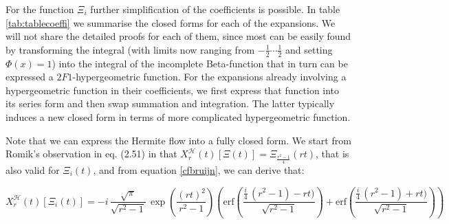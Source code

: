 \documentclass[a4paper,11pt,twoside]{amsart}
\newcommand\erf{\mathrm{erf}}
\begin{document}
\pagebreak
For the function $\Xi_i$ further simplification of the coefficients is possible. In table \ref{tab:tablecoeffi} we summarise the closed forms for each of the expansions. We will not share the detailed proofs for each of them, since most can be easily found by transforming the integral (with limits now ranging from $-\frac12\cdots\frac12$ and setting $\Phi(x)=1$) into the integral of the incomplete Beta-function that in turn can be expressed a $2F1$-hypergeometric function. For the expansions already involving a hypergeometric function in their coefficients, we first express that function into its series form and then swap summation and integration. The latter typically induces a new closed form in terms of more complicated hypergeometric function.

Note that we can express the Hermite flow into a fully closed form. We start from Romik's observation in eq. (2.51) in \cite{rom} that $\displaystyle X^{\mathcal{H}}_r(t)\left[\Xi(t)\right] = \Xi_{\frac{r^2-1}{4}}(rt)$, that is also valid for $\Xi_i(t)$, and from equation \ref{cfbruijn}, we can derive that:

$$X^{\mathcal{H}}_r(t)\left[\Xi_i(t)\right] = -i\,\frac{\sqrt{\pi}}{\sqrt{r^2-1}}\,\exp\left(\frac{(rt)^2}{r^2-1}\right)\left(\erf\left(\frac{\frac{i}{4}\,(r^2-1)-rt)}{\sqrt{r^2-1}}\right)+\erf\left(\frac{\frac{i}{4}\,(r^2-1)+rt)}{\sqrt{r^2-1}}\right)\right)$$
 
\end{document}
